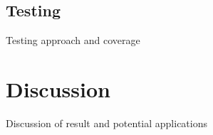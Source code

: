 \documentclass[12pt,a4paper,titlepage,oneside,english]{article}
\begin{document}
\subsection{Testing}
Testing approach and coverage



\section{Discussion}
Discussion of result and potential applications



\newpage
\setcounter{page}{1}
\onehalfspacing
{}



\end{document}
